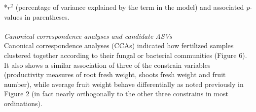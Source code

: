 \documentclass[11pt,]{article}
\begin{document}
*\(r^2\) (percentage of variance explained by the term in the model) and
associated \emph{p}-values in parentheses. ~\\
\hspace*{0.333em}\\
\emph{Canonical correspondence analyses and candidate ASVs}\\
Canonical correspondence analyses (CCAs) indicated how fertilized
samples clustered together according to their fungal or bacterial
communities (Figure 6). It also shows a similar association of three of
the constrain variables (productivity measures of root fresh weight,
shoots fresh weight and fruit number), while average fruit weight behave
differentially as noted previously in Figure 2 (in fact nearly
orthogonally to the other three constrains in most ordinations).\\
\hspace*{0.333em}\\
\end{document}
